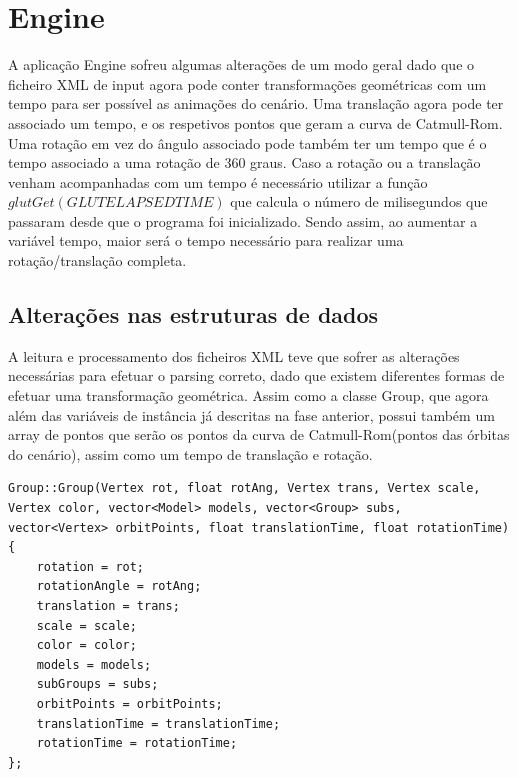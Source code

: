 \documentclass[12pt]{article}
\begin{document}
\section{Engine}
A aplicação Engine sofreu algumas alterações de um modo geral dado que o ficheiro XML de input agora pode conter transformações geométricas com um tempo para
ser possível as animações do cenário.
Uma translação agora pode ter associado um tempo, e os respetivos pontos que geram a curva de Catmull-Rom.
Uma rotação em vez do ângulo associado pode também ter um tempo que é o tempo associado a uma rotação de 360 graus.
Caso a rotação ou a translação venham acompanhadas com um tempo é necessário utilizar a função $glutGet(GLUTELAPSEDTIME)$
que calcula o número de milisegundos que passaram desde que o programa foi
inicializado. Sendo assim, ao aumentar a variável tempo, maior
será o tempo necessário para realizar uma rotação/translação completa.
\subsection{Alterações nas estruturas de dados}
A leitura e processamento dos ficheiros XML teve que sofrer as alterações necessárias para efetuar o parsing
correto, dado que existem diferentes formas de efetuar uma transformação geométrica. Assim como a classe Group, que agora
além das variáveis de instância já descritas na fase anterior, possui também um array de pontos que serão os pontos
da curva de Catmull-Rom(pontos das órbitas do cenário), assim como um tempo de translação e rotação.
\begin{lstlisting}
Group::Group(Vertex rot, float rotAng, Vertex trans, Vertex scale,
Vertex color, vector<Model> models, vector<Group> subs, 
vector<Vertex> orbitPoints, float translationTime, float rotationTime)
{
    rotation = rot;
    rotationAngle = rotAng;
    translation = trans;
    scale = scale;
    color = color;
    models = models;
    subGroups = subs;
    orbitPoints = orbitPoints;
    translationTime = translationTime;
    rotationTime = rotationTime;
};
\end{lstlisting}
\end{document}
